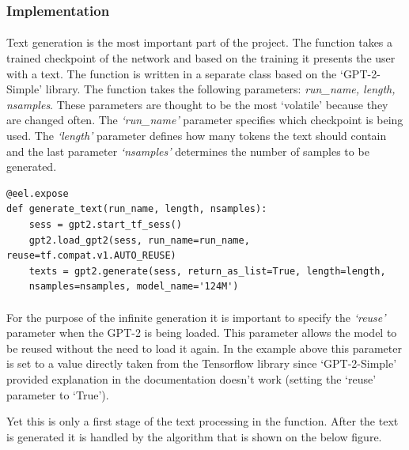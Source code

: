 \documentclass[12pt]{report}
\newenvironment{code}{\captionsetup{type=listing}}{}
\begin{document}
\subsubsection*{Implementation}
\paragraph{}
Text generation is the most important part of the project. The function takes a trained checkpoint of the network and
based on the training it presents the user with a text. The function is written in a separate class based on the
`GPT-2-Simple' library. The function takes the following parameters: \textit{run\_name, length, nsamples}. These
parameters are thought to be the most `volatile' because they are changed often. The \textit{`run\_name'} parameter specifies
which checkpoint is being used. The \textit{`length'} parameter defines how many tokens the text should contain and the last parameter
\textit{`nsamples'} determines the number of samples to be generated.

\begin{code}
\begin{verbatim}
@eel.expose
def generate_text(run_name, length, nsamples):
    sess = gpt2.start_tf_sess()
    gpt2.load_gpt2(sess, run_name=run_name, reuse=tf.compat.v1.AUTO_REUSE)
    texts = gpt2.generate(sess, return_as_list=True, length=length,
    nsamples=nsamples, model_name='124M')
\end{verbatim}
\end{code}

\paragraph*{}
For the purpose of the infinite generation it is important to specify the \textit{`reuse'} parameter when the GPT-2
is being loaded. This parameter allows the model to be reused without the need to load it again. In the example above
this parameter is set to a value directly taken from the Tensorflow library since `GPT-2-Simple' provided explanation
in the documentation doesn't work (setting the `reuse' parameter to `True').

Yet this is only a first stage of the text processing in the function. After the text is generated it is handled by the
algorithm that is shown on the below figure.
\end{document}
